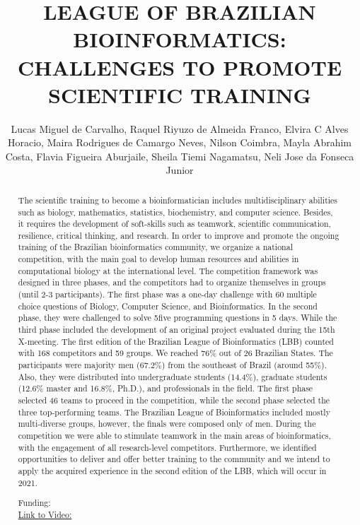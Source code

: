 \documentclass[twoside]{article}
\title{\vspace{-15mm}\fontsize{24pt}{10pt}\selectfont\textbf{ LEAGUE OF BRAZILIAN BIOINFORMATICS: CHALLENGES TO PROMOTE SCIENTIFIC TRAINING }} %
\author{ Lucas Miguel de Carvalho,  Raquel Riyuzo de Almeida Franco,  Elvira C Alves Horacio,  Maira Rodrigues de Camargo Neves,  Nilson Coimbra,  Mayla Abrahim Costa,  Flavia Figueira Aburjaile,  Sheila Tiemi Nagamatsu,  Neli Jose da Fonseca Junior }
\affil{ UNIVERSIDADE ESTADUAL DE CAMPINAS,  FIOCRUZ - IOC,  RSG BRAZIL,  EMBL-EBI,  UNIVERSIDADE FEDERAL DE MINAS GERAIS,  CTBE/CNPEM,  IOC/Fiocruz,  UNIVERSIDADE DE S\~AO PAULO }
\date{}
\begin{document}
  
  
  \maketitle %
  
  
  \thispagestyle{fancy} %
  
  
  \begin{abstract}
  The scientific training to become a bioinformatician includes multidisciplinary abilities such as biology,  mathematics,  statistics,  biochemistry,  and computer science. Besides,  it requires the development of soft-skills such as teamwork,  scientific communication,  resilience,  critical thinking,  and research. In order to improve and promote the ongoing training of the Brazilian bioinformatics community,  we organize a national competition,  with the main goal to develop human resources and abilities in computational biology at the international level.  The competition framework was designed in three phases,  and the competitors had to organize themselves in groups (until 2-3 participants). The first phase was a one-day challenge with 60 multiple choice questions of Biology,  Computer Science,  and Bioinformatics. In the second phase,  they were challenged to solve 5five programming questions in 5 days. While the third phase included the development of an original project evaluated during the 15th X-meeting. The first edition of the Brazilian League of Bioinformatics (LBB) counted with 168 competitors and 59 groups. We reached 76\% out of 26 Brazilian States. The participants were majority men (67.2\%) from the southeast of Brazil (around 55\%). Also,  they were distributed into undergraduate students (14.4\%),  graduate students (12.6\% master and 16.8\%,  Ph.D.),  and professionals in the field. The first phase selected 46 teams to proceed in the competition,  while the second phase selected the three top-performing teams. The Brazilian League of Bioinformatics included mostly multi-diverse groups,  however,  the finals were composed only of men. During the competition we were able to stimulate teamwork in the main areas of bioinformatics,  with the engagement of all research-level competitors. Furthermore,  we identified opportunities to deliver and offer better training to the community and we intend to apply the acquired experience in the second edition of the LBB,  which will occur in 2021.
  
  Funding:   \\
  \href{http://ab3c.org.br/xpress_pres2020/xmxp2020-303431.html}{Link to Video:}

  \end{abstract}
   
  
\end{document}
